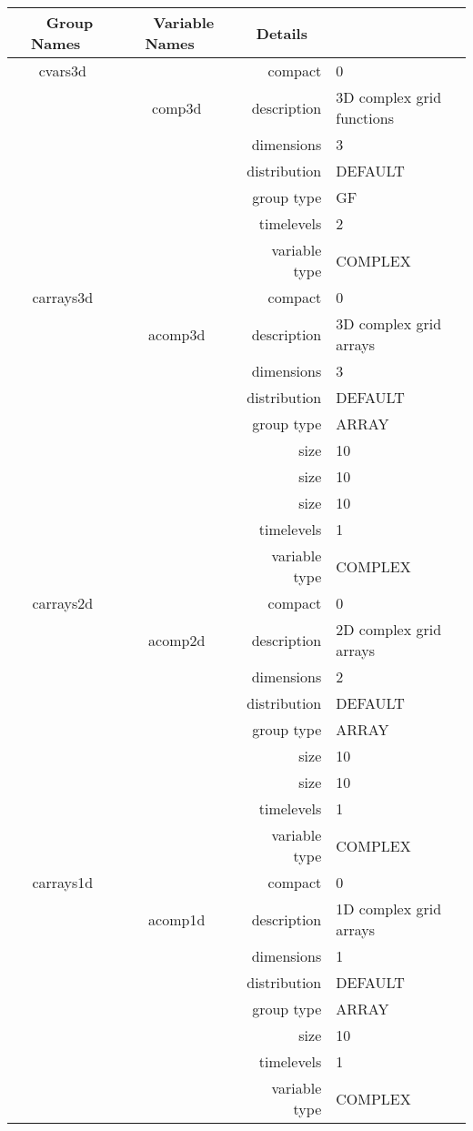 \begin{tabular*}{150mm}{|c|c@{\extracolsep{\fill}}|rl|} \hline 
~ {\bf Group Names} ~ & ~ {\bf Variable Names} ~  &{\bf Details} ~ & ~\\ 
\hline 
cvars3d &  & compact & 0 \\ 
 & comp3d & description & 3D complex grid functions \\ 
 &  & dimensions & 3 \\ 
 &  & distribution & DEFAULT \\ 
 &  & group type & GF \\ 
 &  & timelevels & 2 \\ 
 &  & variable type & COMPLEX \\ 
\hline 
carrays3d &  & compact & 0 \\ 
 & acomp3d & description & 3D complex grid arrays \\ 
 &  & dimensions & 3 \\ 
 &  & distribution & DEFAULT \\ 
 &  & group type & ARRAY \\ 
 &  & size & 10 \\ 
& ~ & size & 10 \\ 
 &  & size & 10 \\ 
 &  & timelevels & 1 \\ 
 &  & variable type & COMPLEX \\ 
\hline 
carrays2d &  & compact & 0 \\ 
 & acomp2d & description & 2D complex grid arrays \\ 
 &  & dimensions & 2 \\ 
 &  & distribution & DEFAULT \\ 
 &  & group type & ARRAY \\ 
 &  & size & 10 \\ 
& ~ & size & 10 \\ 
 &  & timelevels & 1 \\ 
 &  & variable type & COMPLEX \\ 
\hline 
carrays1d &  & compact & 0 \\ 
 & acomp1d & description & 1D complex grid arrays \\ 
 &  & dimensions & 1 \\ 
 &  & distribution & DEFAULT \\ 
 &  & group type & ARRAY \\ 
 &  & size & 10 \\ 
 &  & timelevels & 1 \\ 
 &  & variable type & COMPLEX \\ 

\end{tabular*}
